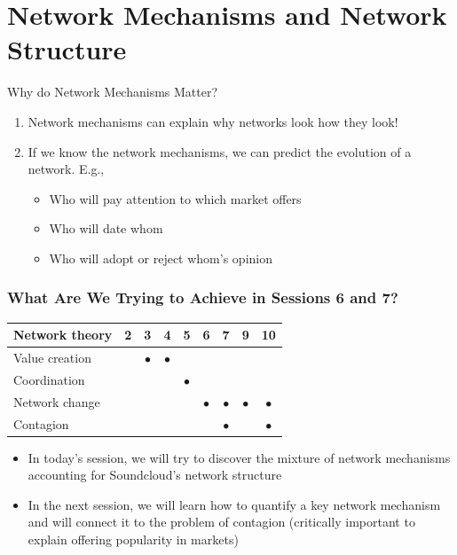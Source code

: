 \documentclass[notes, aspectratio=1610]{beamer}
\begin{document}

\section{Network Mechanisms and Network Structure}

\begin{frame}{Why do Network Mechanisms Matter?}{}
	\begin{enumerate}
		\item Network mechanisms can explain why networks look how 
		they look!
		\item If we know the network mechanisms, we can predict the
		evolution of a network. E.g.,
		\begin{itemize}
			\item 
			Who will pay attention to which market offers
			\item 
			Who will date whom
			\item 
			Who will adopt or reject whom's opinion
		\end{itemize}
	\end{enumerate}
\end{frame}

\begin{frame}
	\frametitle{What Are We Trying to Achieve in Sessions 6 and 7?}
	\begin{table}
		\begin{tabular}[c]{l|c|c|c|c|c|c|c|c}
			\textbf{Network theory} & 
			\textbf{2} & 
			\textbf{3} & 
			\textbf{4} & 
			\textbf{5} & 
			\textbf{6} & 
			\textbf{7} & 
			\textbf{9} & 
			\textbf{10}\\
			\hline
			Value creation &  & $\bullet$ & $\bullet$ &  &  &  &  & \\	
			Coordination &  &  &  & $\bullet$ &  &  &  & \\	
			Network change &  &  &  &  & $\bullet$ & $\bullet$ & $\bullet$ & $\bullet$\\	
			Contagion &  &  &  &  &  & $\bullet$ &  & $\bullet$ \\	
		\end{tabular}
	\end{table}

	\pause

	\begin{itemize}
		\item In today's session, we will try to discover the 
		mixture of network 
		mechanisms accounting for Soundcloud's network structure
		\pause
		\item In the next session, we will learn how to quantify a key 
		network mechanism and will connect it to the problem 
		of contagion (critically important to explain offering 
		popularity in markets)
	\end{itemize}
\end{frame}
\end{document}
